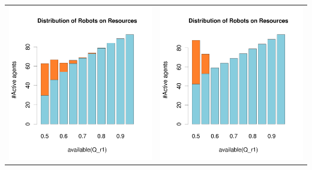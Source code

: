 \documentclass[a4paper,10pt]{article}
\begin{document}
\begin{table}[h!]
\begin{tabular}{cc}
 \newline
 \includegraphics[width=\imgSize]{images/5StaticEnv/barplotAliveR1AndR2_mean_env0}& \includegraphics[width=\imgSize]{images/5StaticEnv/barplotAliveR1AndR2_median_env0}\\
 \end{tabular}
\end{table}
\end{document}
